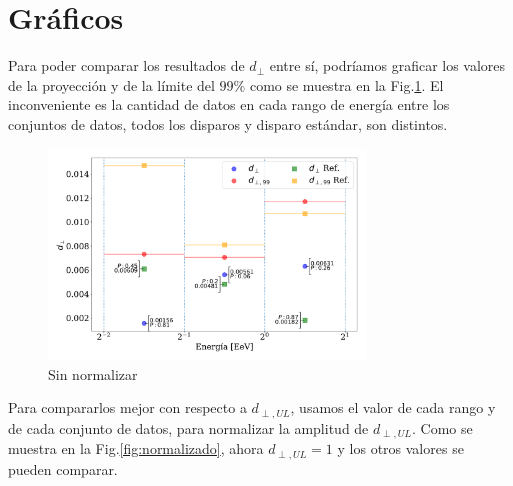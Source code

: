 \documentclass[11pt,papel,oneside,singlespace]{ibtesis}
\begin{document}
    \section{Gráficos}

    Para poder comparar los resultados de $d_\perp$ entre sí, podríamos graficar los valores de la proyección y de la límite del $99\%$ como se muestra en la Fig.\ref{fig:no_normalizado}. El inconveniente es la cantidad de datos en cada rango de energía entre los conjuntos de datos, todos los disparos y disparo estándar, son distintos.



    \begin{figure}[H]
        \begin{small}
            \begin{center}
                \includegraphics[width=0.75\textwidth]{d_perp_no_normalizado_v2.pdf}
            \end{center}
            \caption{Sin normalizar}
            \label{fig:no_normalizado}
        \end{small}
    \end{figure}
    
    Para compararlos mejor con respecto a $d_{\perp,UL}$, usamos el valor de cada rango y de cada conjunto de datos, para normalizar la amplitud de $d_{\perp,UL}$. Como se muestra en la Fig.\ref{fig:normalizado}, ahora $d_{\perp,UL}=1$ y los otros valores se pueden comparar. 
\end{document}

